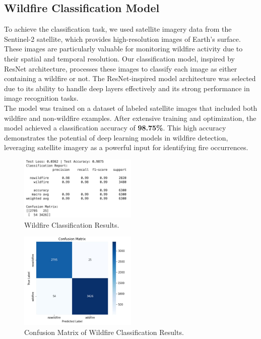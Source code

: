 \documentclass[conference]{IEEEtran}
\begin{document}
\subsection{Wildfire Classification Model}
To achieve the classification task, we used satellite imagery data from the Sentinel-2 satellite, which provides high-resolution images of Earth's surface. These images are particularly valuable for monitoring wildfire activity due to their spatial and temporal resolution. Our classification model, inspired by ResNet architecture, processes these images to classify each image as either containing a wildfire or not. The ResNet-inspired model architecture was selected due to its ability to handle deep layers effectively and its strong performance in image recognition tasks.\\

The model was trained on a dataset of labeled satellite images that included both wildfire and non-wildfire examples. After extensive training and optimization, the model achieved a classification accuracy of \textbf{98.75\%}. This high accuracy demonstrates the potential of deep learning models in wildfire detection, leveraging satellite imagery as a powerful input for identifying fire occurrences.

\begin{figure}[h!]
    \centering
    \includegraphics[width=0.5\textwidth]{result.jpeg}
    \caption{Wildfire Classification Results.}
    \label{fig:your_image_label}
\end{figure}

\begin{figure}[h!]
    \centering
    \includegraphics[width=0.5\textwidth]{cm.jpeg}
    \caption{Confusion Matrix of Wildfire Classification Results.}
    \label{fig:your_image_label}
\end{figure}
\end{document}
